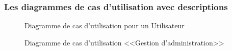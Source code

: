 \documentclass[12pt]{report}
\begin{document}
\subsubsection{\large{Les diagrammes de cas d'utilisation avec descriptions}}

\vspace{0.1in}

\begin{figure}[h]
\centering
  \vspace{-0.1in}
    \centerline{}
    \caption{Diagramme de cas d'utilisation pour un Utilisateur}
\end{figure}

\newpage

\begin{figure}[h]
\centering
    \centerline{}
    \caption{Diagramme de cas d'utilisation <<Gestion d'administration>>}
\end{figure}
\end{document}
